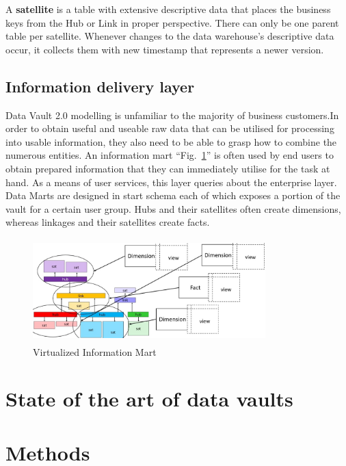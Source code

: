 \documentclass[conference]{IEEEtran}
\begin{document}
A \textbf{satellite} is a table with extensive descriptive data that places the business keys from the Hub or Link in proper perspective. There can only be one parent table per satellite. Whenever changes to the data warehouse's descriptive data occur, it collects them with new timestamp that represents a newer version.

\subsection{Information delivery layer}

Data Vault 2.0 modelling is unfamiliar to the majority of business customers.In order to obtain useful and useable raw data that can be utilised for processing into usable information, they also need to be able to grasp how to combine the numerous entities. An information mart ``Fig.~\ref{fig3}'' is often used by end users to obtain prepared information that they can immediately utilise for the task at hand. As a means of user services, this layer queries about the enterprise layer. Data Marts are designed in start schema each of which exposes a portion of the vault for a certain user group. Hubs and their satellites often create dimensions, whereas linkages and their satellites create facts.

\begin{figure}[htbp]
\centerline{\includegraphics[width=9cm, height=4cm]{Figure3.png}}
\caption{Virtualized Information Mart}
\label{fig3}
\end{figure}


\section{State of the art of data vaults}


\section{Methods}
\end{document}
